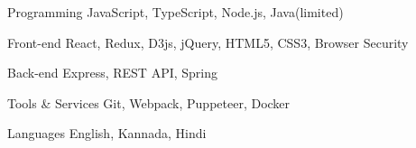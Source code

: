 

\begin{cvskills}

  \cvskill
  {Programming} %
  {JavaScript, TypeScript, Node.js, Java(limited)} %

  \cvskill
  {Front-end} %
  {React, Redux, D3js, jQuery, HTML5, CSS3, Browser Security} %

  \cvskill
  {Back-end} %
  {Express, REST API, Spring} %

  \cvskill
  {Tools \& Services} %
  {Git, Webpack, Puppeteer, Docker} %

  \cvskill
  {Languages} %
  {English, Kannada, Hindi} %

\end{cvskills}
